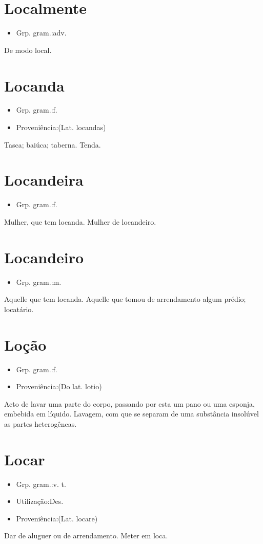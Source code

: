 \section{Localmente}
\begin{itemize}
\item {Grp. gram.:adv.}
\end{itemize}
De modo local.
\section{Locanda}
\begin{itemize}
\item {Grp. gram.:f.}
\end{itemize}
\begin{itemize}
\item {Proveniência:(Lat. \textunderscore locandas\textunderscore )}
\end{itemize}
Tasca; baiúca; taberna.
Tenda.
\section{Locandeira}
\begin{itemize}
\item {Grp. gram.:f.}
\end{itemize}
Mulher, que tem locanda.
Mulher de locandeiro.
\section{Locandeiro}
\begin{itemize}
\item {Grp. gram.:m.}
\end{itemize}
Aquelle que tem locanda.
Aquelle que tomou de arrendamento algum prédio; locatário.
\section{Loção}
\begin{itemize}
\item {Grp. gram.:f.}
\end{itemize}
\begin{itemize}
\item {Proveniência:(Do lat. \textunderscore lotio\textunderscore )}
\end{itemize}
Acto de lavar uma parte do corpo, passando por esta um pano ou uma esponja, embebida em líquido.
Lavagem, com que se separam de uma substância insolúvel as partes heterogêneas.
\section{Locar}
\begin{itemize}
\item {Grp. gram.:v. t.}
\end{itemize}
\begin{itemize}
\item {Utilização:Des.}
\end{itemize}
\begin{itemize}
\item {Proveniência:(Lat. \textunderscore locare\textunderscore )}
\end{itemize}
Dar de aluguer ou de arrendamento.
Meter em loca.
